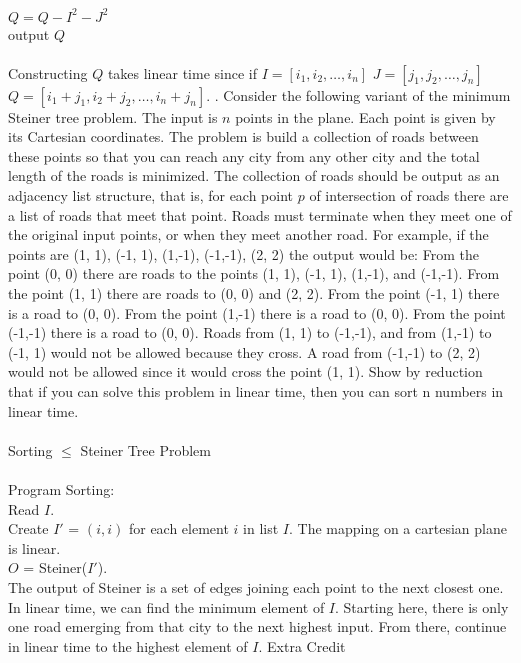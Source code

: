 \documentclass[10pt]{article}
\newcommand{\tab}{\hspace*{2em}}
\begin{document}
		\tab $Q = Q - I^2 - J^2$\\
		\tab output $Q$\\
		\\
		Constructing $Q$ takes linear time since if $I = [i_1, i_2, \ldots, i_n]$ $J = [j_1, j_2, \ldots, j_n]$ 
		$Q = [i_1+j_1, i_2+j_2, \ldots, i_n+j_n]$. 
		. Consider the following variant of the minimum Steiner tree problem. The input is $n$ points in the plane.
		Each point is given by its Cartesian coordinates. The problem is build a collection of roads between
		these points so that you can reach any city from any other city and the total length of the roads is
		minimized. The collection of roads should be output as an adjacency list structure, that is, for each
		point $p$ of intersection of roads there are a list of roads that meet that point. Roads must terminate
		when they meet one of the original input points, or when they meet another road. For example, if the
		points are (1, 1), (-1, 1), (1,-1), (-1,-1), (2, 2) the output would be:
		From the point (0, 0) there are roads to the points (1, 1), (-1, 1), (1,-1), and (-1,-1). From the point
		(1, 1) there are roads to (0, 0) and (2, 2). From the point (-1, 1) there is a road to (0, 0). From the
		point (1,-1) there is a road to (0, 0). From the point (-1,-1) there is a road to (0, 0).
		Roads from (1, 1) to (-1,-1), and from (1,-1) to (-1, 1) would not be allowed because they cross. A
		road from (-1,-1) to (2, 2) would not be allowed since it would cross the point (1, 1).
		Show by reduction that if you can solve this problem in linear time, then you can sort n numbers in
		linear time.\\
		\\
		Sorting $\leq$ Steiner Tree Problem\\
		\\
		Program Sorting:\\
		\tab Read $I$.\\
		\tab Create $I\prime$ = $(i,i)$ for each element $i$ in list $I$. The mapping on a cartesian plane is linear.\\
		\tab $O$ = Steiner($I\prime$).\\
		\tab The output of Steiner is a set of edges joining each point to the next closest one.\\
		\tab In linear time, we can find the minimum element of $I$. Starting here, there is only one road
			emerging from that city to the next highest input. From there, continue in linear time to the
			highest element of $I$.
		\newpage
		Extra Credit\\
\end{document}
